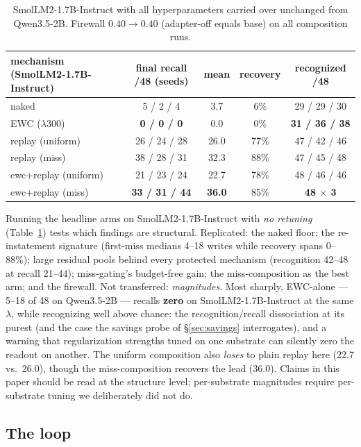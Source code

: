 \documentclass[11pt]{article}
\newcommand{\qwen}{Qwen3.5-2B}
\newcommand{\smol}{SmolLM2-1.7B-Instruct}
\begin{document}
\begin{table}[h]
\centering\small
\begin{tabular}{lcccc}
\toprule
mechanism (\smol{}) & final recall /48 (seeds) & mean & recovery & recognized /48 \\
\midrule
naked            & 5 / 2 / 4    & 3.7  & 6\%  & 29 / 29 / 30 \\
EWC ($\lambda$300) & \textbf{0 / 0 / 0} & 0.0 & 0\% & \textbf{31 / 36 / 38} \\
replay (uniform) & 26 / 24 / 28 & 26.0 & 77\% & 47 / 42 / 46 \\
replay (miss)    & 38 / 28 / 31 & 32.3 & 88\% & 47 / 45 / 48 \\
ewc+replay (uniform) & 21 / 23 / 24 & 22.7 & 78\% & 48 / 46 / 46 \\
ewc+replay (miss) & \textbf{33 / 31 / 44} & \textbf{36.0} & 85\% & \textbf{48 $\times$ 3} \\
\bottomrule
\end{tabular}
\caption{\smol{} with all hyperparameters carried over unchanged from \qwen{}. Firewall $0.40
\to 0.40$ (adapter-off equals base) on all composition runs.}
\label{tab:smol}
\end{table}

Running the headline arms on \smol{} with \emph{no retuning} (Table~\ref{tab:smol}) tests which
findings are structural. Replicated: the naked floor; the re-instatement signature (first-miss
medians 4--18 writes while recovery spans 0--88\%); large residual pools behind every protected
mechanism (recognition 42--48 at recall 21--44); miss-gating's budget-free gain; the
miss-composition as the best arm; and the firewall. Not transferred: \emph{magnitudes}. Most
sharply, EWC-alone --- 5--18 of 48 on \qwen{} --- recalls \textbf{zero} on \smol{} at the same
$\lambda$, while recognizing well above chance: the recognition/recall dissociation at its
purest (and the case the savings probe of \S\ref{sec:savings} interrogates), and a warning that
regularization strengths tuned on one substrate can silently zero the readout on another. The
uniform composition also \emph{loses} to plain replay here (22.7 vs.\ 26.0), though the
miss-composition recovers the lead (36.0). Claims in this paper should be read at the structure
level; per-substrate magnitudes require per-substrate tuning we deliberately did not do.

\subsection{The loop}
\end{document}
